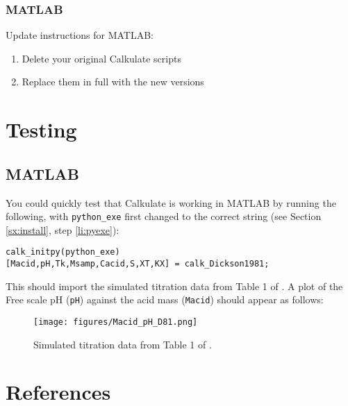 \documentclass[10pt,a4paper,twoside]{article}
\begin{document}
\subsubsection{MATLAB}

Update instructions for MATLAB:

\begin{enumerate}

  \item Delete your original Calkulate scripts
  
  \item Replace them in full with the new versions

\end{enumerate}


\section{Testing}

\subsection{MATLAB}

You could quickly test that Calkulate is working in MATLAB by running the following, with \texttt{python\_exe} first changed to the correct string (see Section \ref{sx:install}, step \ref{li:pyexe}):

\begin{verbatim}
calk_initpy(python_exe)
[Macid,pH,Tk,Msamp,Cacid,S,XT,KX] = calk_Dickson1981;
\end{verbatim}

This should import the simulated titration data from Table 1 of \citet{dickson1981}. A plot of the Free scale pH (\texttt{pH}) against the acid mass (\texttt{Macid}) should appear as follows:

\begin{figure}[h]
\centering
\texttt{[image: figures/Macid\_pH\_D81.png]}
\caption{Simulated titration data from Table 1 of \citet{dickson1981}.}
\label{fig:dickson1981}
\end{figure}

\section{References}



\end{document}
